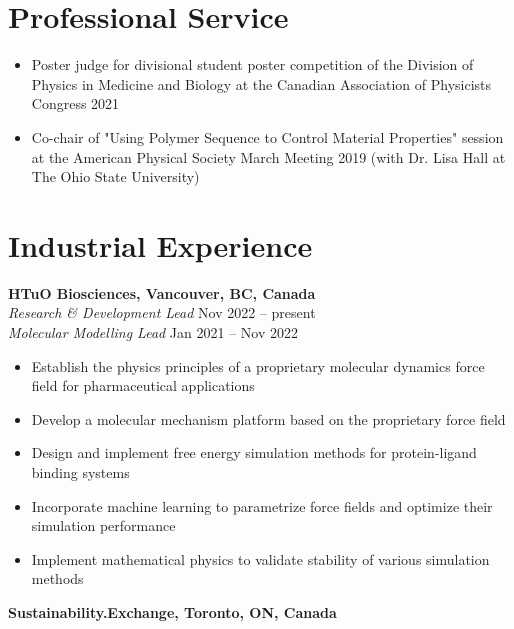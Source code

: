 \documentclass[11pt]{../yhlcv}
\begin{document}
\section*{Professional Service}
\begin{itemize}[leftmargin=*]\itemsep-0.2em
\item Poster judge for divisional student poster competition of the Division of Physics in Medicine and Biology at the Canadian Association of Physicists Congress 2021

\item Co-chair of "Using Polymer Sequence to Control Material Properties" session at the American Physical Society March Meeting 2019 (with Dr. Lisa Hall at The Ohio State University)
\end{itemize}


\section*{Industrial Experience}

{\bf HTuO Biosciences, Vancouver, BC, Canada}\vspace{0.2em} \\

{\it Research \& Development Lead}  \hfill Nov 2022 -- present\vspace{0.2em}\\
{\it Molecular Modelling Lead} \hfill Jan 2021 -- Nov 2022\vspace{-0.5em}\\
\begin{itemize}[leftmargin=*]\itemsep-0.2em
\item Establish the physics principles of a proprietary molecular dynamics force field for pharmaceutical applications
\item Develop a molecular mechanism platform based on the proprietary force field
\item Design and implement free energy simulation methods for protein-ligand binding systems
\item Incorporate machine learning to parametrize force fields and optimize their simulation performance
\item Implement mathematical physics to validate stability of various simulation methods
\end{itemize}


{\bf Sustainability.Exchange, Toronto, ON, Canada}\vspace{0.2em} \\
\end{document}
